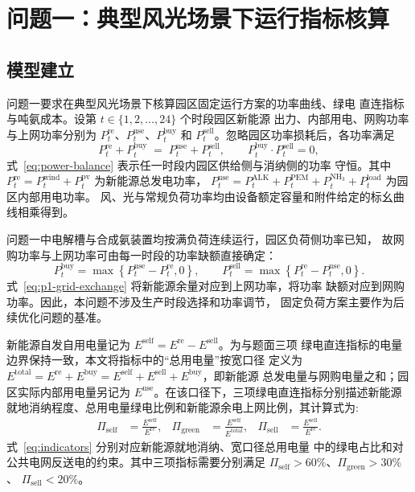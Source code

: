 \section{问题一：典型风光场景下运行指标核算}

\subsection{模型建立}

问题一要求在典型风光场景下核算园区固定运行方案的功率曲线、绿电
直连指标与吨氨成本。设第 $t \in \{1,2,\dots,24\}$ 个时段园区新能源
出力、内部用电、网购功率与上网功率分别为
$P_t^{\mathrm{re}}$、$P_t^{\mathrm{use}}$、$P_t^{\mathrm{buy}}$
和 $P_t^{\mathrm{sell}}$。忽略园区功率损耗后，各功率满足
\begin{equation}
  P^{\mathrm{re}}_t + P^{\mathrm{buy}}_t \;=\; P^{\mathrm{use}}_t + P^{\mathrm{sell}}_t,
  \qquad P^{\mathrm{buy}}_t \cdot P^{\mathrm{sell}}_t = 0,
  \label{eq:power-balance}
\end{equation}
式~\eqref{eq:power-balance} 表示任一时段内园区供给侧与消纳侧的功率
守恒。其中 $P^{\mathrm{re}}_t = P^{\mathrm{wind}}_t + P^{\mathrm{pv}}_t$
为新能源总发电功率，
$P^{\mathrm{use}}_t = P^{\mathrm{ALK}}_t + P^{\mathrm{PEM}}_t
+ P^{\mathrm{NH_3}}_t + P^{\mathrm{load}}_t$ 为园区内部用电功率。
风、光与常规负荷功率均由设备额定容量和附件给定的标幺曲线相乘得到。

问题一中电解槽与合成氨装置均按满负荷连续运行，园区负荷侧功率已知，
故网购功率与上网功率可由每一时段的功率缺额直接确定：
\begin{equation}
  P_t^{\mathrm{buy}}
  = \max\!\left\{P_t^{\mathrm{use}}-P_t^{\mathrm{re}},0\right\},
  \qquad
  P_t^{\mathrm{sell}}
  = \max\!\left\{P_t^{\mathrm{re}}-P_t^{\mathrm{use}},0\right\}.
  \label{eq:p1-grid-exchange}
\end{equation}
式~\eqref{eq:p1-grid-exchange} 将新能源余量对应到上网功率，将功率
缺额对应到网购功率。因此，本问题不涉及生产时段选择和功率调节，
固定负荷方案主要作为后续优化问题的基准。

新能源自发自用电量记为
$E^{\mathrm{self}} = E^{\mathrm{re}} - E^{\mathrm{sell}}$。为与题面三项
绿电直连指标的电量边界保持一致，本文将指标中的``总用电量''按宽口径
定义为
$E^{\mathrm{total}} = E^{\mathrm{re}} + E^{\mathrm{buy}}
= E^{\mathrm{self}} + E^{\mathrm{sell}} + E^{\mathrm{buy}}$，即新能源
总发电量与网购电量之和；园区实际内部用电量另记为
$E^{\mathrm{use}}$。在该口径下，三项绿电直连指标分别描述新能源
就地消纳程度、总用电量绿电比例和新能源余电上网比例，其计算式为:
\begin{align}
  \Pi_{\mathrm{self}}
  &= \frac{E^{\mathrm{self}}}{E^{\mathrm{re}}}, &
  \Pi_{\mathrm{green}}
  &= \frac{E^{\mathrm{self}}}{E^{\mathrm{total}}}, &
  \Pi_{\mathrm{sell}}
  &= \frac{E^{\mathrm{sell}}}{E^{\mathrm{re}}}.
  \label{eq:indicators}
\end{align}
式~\eqref{eq:indicators} 分别对应新能源就地消纳、宽口径总用电量
中的绿电占比和对公共电网反送电的约束。其中三项指标需要分别满足
$\Pi_{\mathrm{self}} > 60\%$、$\Pi_{\mathrm{green}} > 30\%$、
$\Pi_{\mathrm{sell}} < 20\%$。

